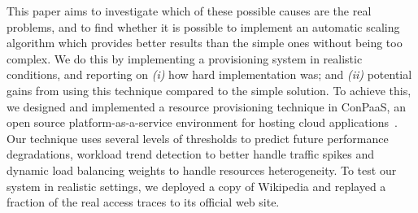 This paper aims to investigate which of these possible causes 
are the real problems, and to find whether it is possible to
implement an automatic scaling algorithm which provides better 
results than the simple ones without being too complex.
We do this by implementing a provisioning system in realistic 
conditions, and reporting on \emph{(i)} how hard implementation 
was; and \emph{(ii)} potential gains from using this  technique 
compared to the simple solution. To achieve this, we designed 
and implemented a resource provisioning technique in ConPaaS, 
an open source platform-as-a-service environment for hosting 
cloud applications~\cite{conpaasIC}. Our technique uses several
levels of thresholds to predict future performance degradations, 
workload trend detection to better handle traffic spikes
and dynamic load balancing weights to handle resources heterogeneity. 
To test our system in realistic settings, we deployed a copy of 
Wikipedia and replayed a fraction of the real access traces to
its official web site.



